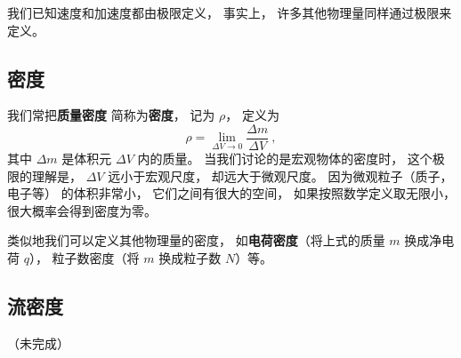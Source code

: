 
\begin{issues}
\issueDraft
\end{issues}



我们已知速度和加速度都由极限定义， 事实上， 许多其他物理量同样通过极限来定义。

\subsection{密度}
我们常把\textbf{质量密度} 简称为\textbf{密度}， 记为 $\rho$， 定义为
\begin{equation}
\rho = \lim_{\Delta V \to 0} \frac{\Delta m}{\Delta V}~,
\end{equation}
其中 $\Delta m$ 是体积元 $\Delta V$ 内的质量。 当我们讨论的是宏观物体的密度时， 这个极限的理解是， $\Delta V$ 远小于宏观尺度， 却远大于微观尺度。 因为微观粒子（质子， 电子等） 的体积非常小， 它们之间有很大的空间， 如果按照数学定义取无限小， 很大概率会得到密度为零。

类似地我们可以定义其他物理量的密度， 如\textbf{电荷密度}（将上式的质量 $m$ 换成净电荷 $q$）， 粒子数密度（将 $m$ 换成粒子数 $N$）等。

\subsection{流密度}
（未完成）




